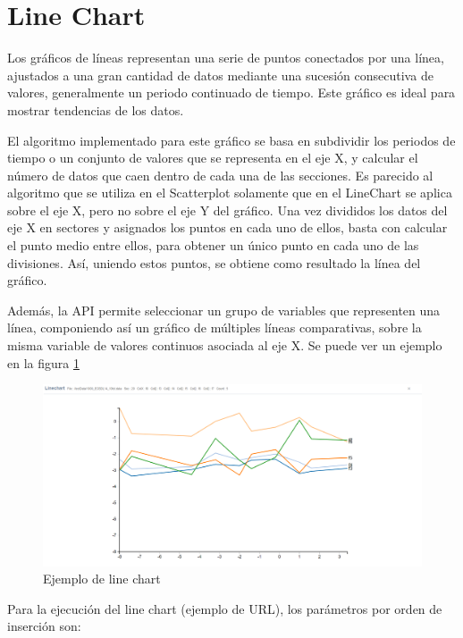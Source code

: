 
\section{Line Chart}
Los gráficos de líneas representan una serie de puntos conectados por una línea, ajustados a una gran cantidad de datos mediante una sucesión consecutiva de valores, generalmente un periodo continuado de tiempo. Este gráfico es ideal para mostrar tendencias de los datos.

El algoritmo implementado para este gráfico se basa en subdividir los periodos de tiempo o un conjunto de valores que se representa en el eje X, y calcular el número de datos que caen dentro de cada una de las secciones. Es parecido al algoritmo que se utiliza en el Scatterplot solamente que en el LineChart se aplica sobre el eje X, pero no sobre el eje Y del gráfico. Una vez divididos los datos del eje X en sectores y asignados los puntos en cada uno de ellos, basta con calcular el punto medio entre ellos, para obtener un único punto en cada uno de las divisiones. Así, uniendo estos puntos, se obtiene como resultado la línea del gráfico.

Además, la API permite seleccionar un grupo de variables que representen una línea, componiendo así un gráfico de múltiples líneas comparativas, sobre la misma variable de valores continuos asociada al eje X. Se puede ver un ejemplo en la figura \ref{fig:ejemplolinechart}
\begin{figure}
	\centering
	\includegraphics[width=1\linewidth]{imagenes/ejemplo_linechart}
	\caption{Ejemplo de line chart}
	\label{fig:ejemplolinechart}
\end{figure}

Para la ejecución del line chart (ejemplo de URL\footnotemark), los parámetros por orden de inserción son:

